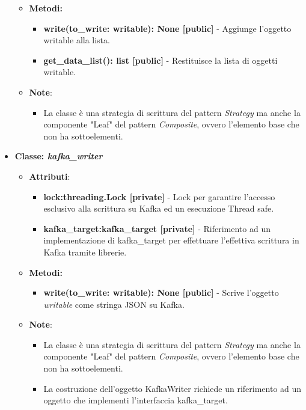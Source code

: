 \begin{itemize}
\begin{itemize}
\begin{itemize}
    \end{itemize}
    \item \textbf{Metodi: }
    \begin{itemize}
        \item \textbf{write(to\_write: writable): None [public]} - Aggiunge l'oggetto writable alla lista.
        \item \textbf{get\_data\_list(): list [public]} - Restituisce la lista di oggetti writable.
    \end{itemize}
    \item\textbf{Note}:
        \begin{itemize}
            \item La classe è una strategia di scrittura del pattern \textit{Strategy} ma anche la componente "Leaf" del pattern \textit{Composite}, ovvero l'elemento base che non ha sottoelementi.
        \end{itemize}
    \end{itemize}
    \item{\textbf{Classe: \textit{kafka\_writer}}}
    \begin{itemize}
    \item\textbf{Attributi}:
        \begin{itemize}
        \item \textbf{lock:threading.Lock [private]} - Lock per garantire l'accesso esclusivo alla scrittura su Kafka ed un esecuzione Thread safe.
        \item \textbf{kafka\_target:kafka\_target [private]} - Riferimento ad un implementazione di kafka\_target per effettuare l'effettiva scrittura in Kafka tramite librerie.
    \end{itemize}
    \item \textbf{Metodi: }
    \begin{itemize}
        \item \textbf{write(to\_write: writable): None [public]} - Scrive l'oggetto \textit{writable} come stringa JSON su Kafka.
    \end{itemize}
    \item\textbf{Note}:
        \begin{itemize}
            \item La classe è una strategia di scrittura del pattern \textit{Strategy} ma anche la componente "Leaf" del pattern \textit{Composite}, ovvero l'elemento base che non ha sottoelementi.
            \item La costruzione dell'oggetto KafkaWriter richiede un riferimento ad un oggetto che implementi l'interfaccia kafka\_target.

\end{itemize}
\end{itemize}
\end{itemize}
